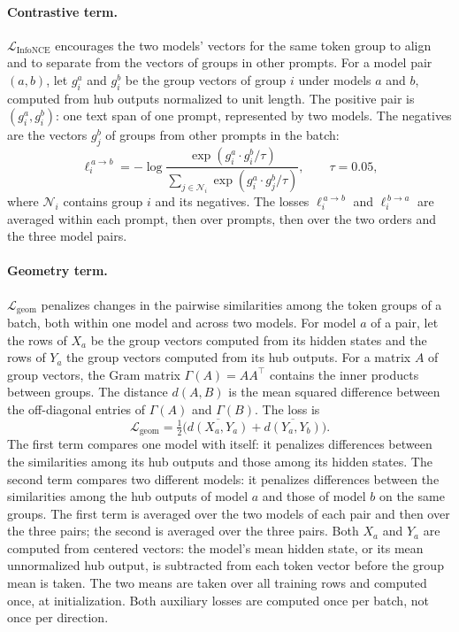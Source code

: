 \paragraph{Contrastive term.} $\mathcal{L}_{\text{InfoNCE}}$ encourages the two models' vectors for the same token group to align and to separate from the vectors of groups in other prompts.
For a model pair $(a,b)$, let $g^a_i$ and $g^b_i$ be the group vectors of group $i$ under models $a$ and $b$, computed from hub outputs normalized to unit length.
The positive pair is $(g^a_i, g^b_i)$: one text span of one prompt, represented by two models.
The negatives are the vectors $g^b_j$ of groups from other prompts in the batch:
\begin{equation}
\ell^{\,a\to b}_i = -\log\frac{\exp(g^a_i\cdot g^b_i/\tau)}{\sum_{j\in\mathcal{N}_i}\exp(g^a_i\cdot g^b_j/\tau)},
\qquad \tau = 0.05 ,
\label{eq:hub:infonce}
\end{equation}
where $\mathcal{N}_i$ contains group $i$ and its negatives.
The losses $\ell^{\,a\to b}_i$ and $\ell^{\,b\to a}_i$ are averaged within each prompt, then over prompts, then over the two orders and the three model pairs. %

\paragraph{Geometry term.} $\mathcal{L}_{\text{geom}}$ penalizes changes in the pairwise similarities among the token groups of a batch, both within one model and across two models.
For model $a$ of a pair, let the rows of $X_a$ be the group vectors computed from its hidden states and the rows of $Y_a$ the group vectors computed from its hub outputs.
For a matrix $A$ of group vectors, the Gram matrix $\Gamma(A) = AA^{\top}$ contains the inner products between groups.
The distance $d(A,B)$ is the mean squared difference between the off-diagonal entries of $\Gamma(A)$ and $\Gamma(B)$.
The loss is
\begin{equation}
\mathcal{L}_{\text{geom}} = \tfrac{1}{2}\Big(\overline{d(X_a, Y_a)} + \overline{d(Y_a, Y_b)}\Big).
\label{eq:hub:geom}
\end{equation}
The first term compares one model with itself: it penalizes differences between the similarities among its hub outputs and those among its hidden states.
The second term compares two different models: it penalizes differences between the similarities among the hub outputs of model $a$ and those of model $b$ on the same groups.
The first term is averaged over the two models of each pair and then over the three pairs; the second is averaged over the three pairs.
Both $X_a$ and $Y_a$ are computed from centered vectors: the model's mean hidden state, or its mean unnormalized hub output, is subtracted from each token vector before the group mean is taken.
The two means are taken over all training rows and computed once, at initialization.
Both auxiliary losses are computed once per batch, not once per direction. %

